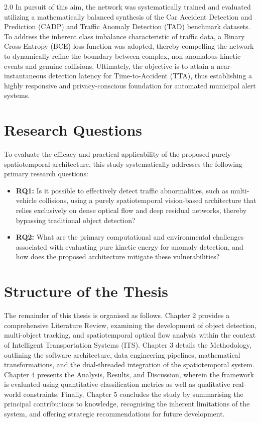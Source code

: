 \begin{spacing}{2.0}
In pursuit of this aim, the network was systematically trained and evaluated utilizing a mathematically balanced synthesis of the Car Accident Detection and Prediction (CADP) and Traffic Anomaly Detection (TAD) benchmark datasets. To address the inherent class imbalance characteristic of traffic data, a Binary Cross-Entropy (BCE) loss function was adopted, thereby compelling the network to dynamically refine the boundary between complex, non-anomalous kinetic events and genuine collisions. Ultimately, the objective is to attain a near-instantaneous detection latency for Time-to-Accident (TTA), thus establishing a highly responsive and privacy-conscious foundation for automated municipal alert systems.

\section{Research Questions}
To evaluate the efficacy and practical applicability of the proposed purely spatiotemporal architecture, this study systematically addresses the following primary research questions:
\begin{itemize}
    \item \textbf{RQ1:} Is it possible to effectively detect traffic abnormalities, such as multi-vehicle collisions, using a purely spatiotemporal vision-based architecture that relies exclusively on dense optical flow and deep residual networks, thereby bypassing traditional object detection?
    \item \textbf{RQ2:} What are the primary computational and environmental challenges associated with evaluating pure kinetic energy for anomaly detection, and how does the proposed architecture mitigate these vulnerabilities?
\end{itemize}

\section{Structure of the Thesis}
The remainder of this thesis is organised as follows. Chapter 2 provides a comprehensive Literature Review, examining the development of object detection, multi-object tracking, and spatiotemporal optical flow analysis within the context of Intelligent Transportation Systems (ITS). Chapter 3 details the Methodology, outlining the software architecture, data engineering pipelines, mathematical transformations, and the dual-threaded integration of the spatiotemporal system. Chapter 4 presents the Analysis, Results, and Discussion, wherein the framework is evaluated using quantitative classification metrics as well as qualitative real-world constraints. Finally, Chapter 5 concludes the study by summarising the principal contributions to knowledge, recognising the inherent limitations of the system, and offering strategic recommendations for future development.

\end{spacing}
\newpage


